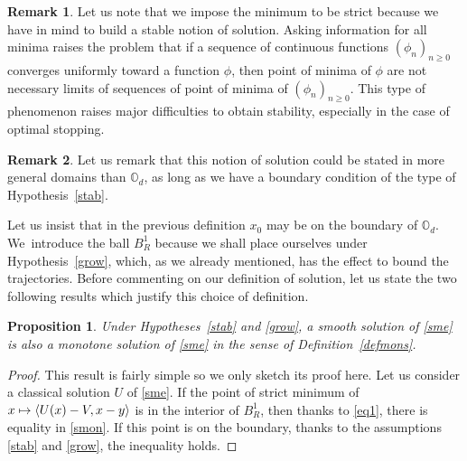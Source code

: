 \documentclass[JEP,XML,SOM,Unicode,NoEqCountersInSection,published]{cedram}
\newcommand\mto{\mathchoice{\longmapsto}{\mapsto}{\mapsto}{\mapsto}}
\newtheorem{Prop}{Proposition}[section]
\theoremstyle{definition}
\newtheorem{Rem}{Remark}[section]
\begin{document}
\begin{Rem}
Let us note that we impose the minimum to be strict because we have in mind to build a stable notion of solution. Asking information for all minima raises the problem that if a sequence of continuous functions $(\phi_n)_{n \geq 0}$ converges uniformly toward a function $\phi$, then point of minima of $\phi$ are not necessary limits of sequences of point of minima of $(\phi_n)_{n \geq 0}$. This type of phenomenon raises major difficulties to obtain stability, especially in the case of optimal stopping.
\end{Rem}

\begin{Rem}
Let us remark that this notion of solution could be stated in more general domains than $\mathbb{O}_d$, as long as we have a boundary condition of the type of Hypothesis~\ref{stab}.
\end{Rem}
Let us insist that in the previous definition $x_0$ may be on the boundary of $\mathbb{O}_d$. We~introduce the ball $B^1_R$ because we shall place ourselves under Hypothesis~\ref{grow}, which, as we already mentioned, has the effect to bound the trajectories. Before commenting on our definition of solution, let us state the two following results which justify this choice of definition.
\begin{Prop}
Under Hypotheses~\ref{stab} and \ref{grow}, a smooth solution of \eqref{sme} is also a monotone solution of \eqref{sme} in the sense of Definition~\ref{defmons}.
\end{Prop}

\begin{proof}
This result is fairly simple so we only sketch its proof here. Let us consider a classical solution $U$ of \eqref{sme}. If the point of strict minimum of $x \mto \langle U(x)-V, x-y \rangle$ is in the interior of $B^1_R$, then thanks to \eqref{eq1}, there is equality in \eqref{smon}. If this point is on the boundary, thanks to the assumptions \ref{stab} and \ref{grow}, the inequality holds.
\end{proof}
\end{document}
